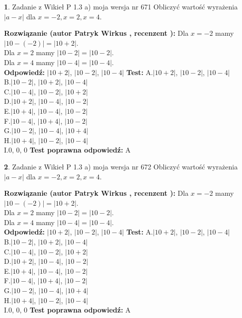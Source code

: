 \documentclass[12pt, a4paper]{article}
\theoremstyle{definition} %
\newtheorem{zad}{}
\newcommand{\zadStart}[1]{\begin{zad}#1\newline}
\newcommand{\zadStop}{\end{zad}}
\newcommand{\rozwStart}[2]{\noindent \textbf{Rozwiązanie (autor #1 , recenzent #2): }\newline}
\newcommand{\rozwStop}{\newline}
\newcommand{\odpStart}{\noindent \textbf{Odpowiedź:}\newline}
\newcommand{\odpStop}{\newline}
\newcommand{\testStart}{\noindent \textbf{Test:}\newline}
\newcommand{\testStop}{\newline}
\newcommand{\kluczStart}{\noindent \textbf{Test poprawna odpowiedź:}\newline}
\newcommand{\kluczStop}{\newline}
\begin{document}
\zadStart{Zadanie z Wikieł P 1.3 a) moja wersja nr 671}
Obliczyć wartość wyrażenia $|a - x|$ dla $x=-2,x=2,x=4$.
\zadStop
\rozwStart{Patryk Wirkus}{}
Dla $x = -2$ mamy $|10 - (-2)| = |10 + 2|$.\\
Dla $x = 2$ mamy $|10 - 2| = |10 - 2|$.\\
Dla $x = 4$ mamy $|10 - 4| = |10 - 4|$.\\
\rozwStop
\odpStart
$|10 + 2|$, $|10 - 2|$, $|10 - 4|$
\odpStop
\testStart
A.$|10 + 2|$, $|10 - 2|$, $|10 - 4|$\\
B.$|10 - 2|$, $|10 + 2|$, $|10 - 4|$\\
C.$|10 - 4|$, $|10 - 2|$, $|10 + 2|$\\
D.$|10 + 2|$, $|10 - 4|$, $|10 - 2|$\\
E.$|10 + 4|$, $|10 - 4|$, $|10 - 2|$\\
F.$|10 - 4|$, $|10 + 4|$, $|10 - 2|$\\
G.$|10 - 2|$, $|10 - 4|$, $|10 + 4|$\\
H.$|10 + 4|$, $|10 - 2|$, $|10 - 4|$\\
I.$0$, $0$, $0$
\testStop
\kluczStart
A
\kluczStop



\zadStart{Zadanie z Wikieł P 1.3 a) moja wersja nr 672}
Obliczyć wartość wyrażenia $|a - x|$ dla $x=-2,x=2,x=4$.
\zadStop
\rozwStart{Patryk Wirkus}{}
Dla $x = -2$ mamy $|10 - (-2)| = |10 + 2|$.\\
Dla $x = 2$ mamy $|10 - 2| = |10 - 2|$.\\
Dla $x = 4$ mamy $|10 - 4| = |10 - 4|$.\\
\rozwStop
\odpStart
$|10 + 2|$, $|10 - 2|$, $|10 - 4|$
\odpStop
\testStart
A.$|10 + 2|$, $|10 - 2|$, $|10 - 4|$\\
B.$|10 - 2|$, $|10 + 2|$, $|10 - 4|$\\
C.$|10 - 4|$, $|10 - 2|$, $|10 + 2|$\\
D.$|10 + 2|$, $|10 - 4|$, $|10 - 2|$\\
E.$|10 + 4|$, $|10 - 4|$, $|10 - 2|$\\
F.$|10 - 4|$, $|10 + 4|$, $|10 - 2|$\\
G.$|10 - 2|$, $|10 - 4|$, $|10 + 4|$\\
H.$|10 + 4|$, $|10 - 2|$, $|10 - 4|$\\
I.$0$, $0$, $0$
\testStop
\kluczStart
A
\kluczStop
\end{document}
